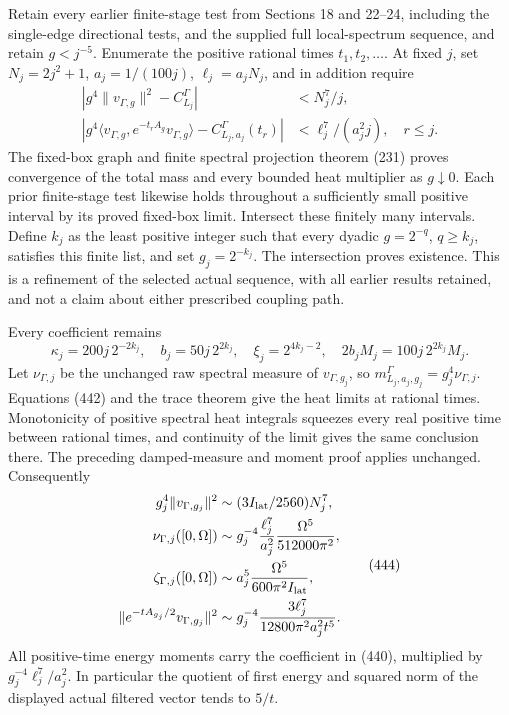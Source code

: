 \documentclass[
  11pt,
]{article}
\begin{document}
Retain every earlier finite-stage test from Sections 18 and 22--24,
including the single-edge directional tests, and the supplied full
local-spectrum sequence, and retain \(g<j^{-5}\). Enumerate the positive
rational times \(t_1,t_2,\ldots\). At fixed \(j\), set \(N_j=2j^2+1\),
\(a_j=1/(100j)\), \(\ell_j=a_jN_j\), and in addition require \[
 \begin{split}
 |g^4\|v_{\Gamma,g}\|^2-C^\Gamma_{L_j}|&<N_j^7/j,\\
 \left|g^4\langle v_{\Gamma,g},e^{-t_rA_g}v_{\Gamma,g}\rangle
                  -C^\Gamma_{L_j,a_j}(t_r)\right|
                         &<\ell_j^7/(a_j^2j),\quad r\le j .
 \end{split}\tag{442}
\] The fixed-box graph and finite spectral projection theorem (231)
proves convergence of the total mass and every bounded heat multiplier
as \(g\downarrow0\). Each prior finite-stage test likewise holds
throughout a sufficiently small positive interval by its proved
fixed-box limit. Intersect these finitely many intervals. Define \(k_j\)
as the least positive integer such that every dyadic \(g=2^{-q}\),
\(q\ge k_j\), satisfies this finite list, and set \(g_j=2^{-k_j}\). The
intersection proves existence. This is a refinement of the selected
actual sequence, with all earlier results retained, and not a claim
about either prescribed coupling path.

Every coefficient remains \[
 \kappa_j=200j\,2^{-2k_j},\quad
 b_j=50j\,2^{2k_j},\quad
 \xi_j=2^{4k_j-2},\quad
 2b_jM_j=100j\,2^{2k_j}M_j .
 \tag{443}
\] Let \(\nu_{\Gamma,j}\) be the unchanged raw spectral measure of
\(v_{\Gamma,g_j}\), so \(m^\Gamma_{L_j,a_j,g_j}=g_j^4\nu_{\Gamma,j}\).
Equations (442) and the trace theorem give the heat limits at rational
times. Monotonicity of positive spectral heat integrals squeezes every
real positive time between rational times, and continuity of the limit
gives the same conclusion there. The preceding damped-measure and moment
proof applies unchanged. Consequently \[
 \begin{split}
 g_j^4\|v_{\Gamma,g_j}\|^2&\sim(3I_{\rm lat}/2560)N_j^7,\\
 \nu_{\Gamma,j}([0,\Omega])
   &\sim g_j^{-4}\frac{\ell_j^7}{a_j^2}
                         \frac{\Omega^5}{512000\pi^2},\\
 \zeta_{\Gamma,j}([0,\Omega])
   &\sim a_j^5\frac{\Omega^5}{600\pi^2I_{\rm lat}},\\
 \|e^{-tA_{g_j}/2}v_{\Gamma,g_j}\|^2
   &\sim g_j^{-4}\frac{3\ell_j^7}{12800\pi^2a_j^2t^5}.
 \end{split}\tag{444}
\] All positive-time energy moments carry the coefficient in (440),
multiplied by \(g_j^{-4}\ell_j^7/a_j^2\). In particular the quotient of
first energy and squared norm of the displayed actual filtered vector
tends to \(5/t\).
\end{document}
